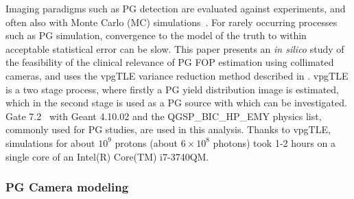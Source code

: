 \documentclass[a4paper,english]{article}
\begin{document}
Imaging paradigms such as PG detection are evaluated against experiments, and often also with Monte Carlo (MC) simulations~\citep{Moteabbed2011,Gueth2013,Robert2013,Golnik2014a,Janssen2014}. For rarely occurring processes such as PG simulation, convergence to the model of the truth to within acceptable statistical error can be slow. This paper presents an \emph{in silico} study of the feasibility of the clinical relevance of PG FOP estimation using collimated cameras, and uses the vpgTLE variance reduction method described in \cite{Huisman2016}. vpgTLE is a two stage process, where firstly a PG yield distribution image is estimated, which in the second stage is used as a PG source with which  can be investigated. Gate 7.2~\citep{Sarrut2014} with Geant 4.10.02 and the QGSP\_BIC\_HP\_EMY physics list, commonly used for PG studies, are used in this analysis. Thanks to vpgTLE, simulations for about $10^9$ protons (about $6\times10^8$ photons) took 1-2 hours on a single core of an Intel(R) Core(TM) i7-3740QM.

\subsubsection{PG Camera modeling}\label{sec:camera}
\end{document}
